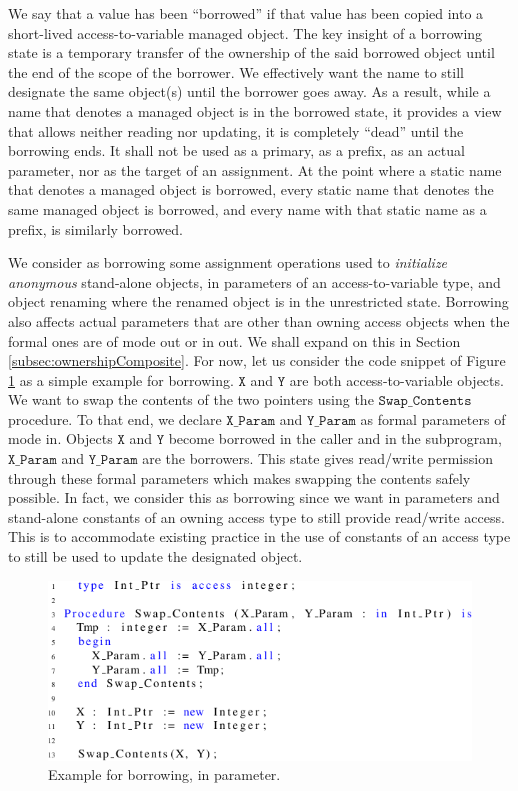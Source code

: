 \documentclass{llncs}
\newcommand\var[1]{\ensuremath{\mathtt{#1}}}
\newcommand{\keyword}[1]{\textsf{#1}}
\begin{document}
We say that a value has been ``borrowed'' if that value has been copied into a short-lived access-to-variable managed object.
The key insight of a borrowing state is a temporary transfer of the ownership of the said borrowed object until the end of the scope of the borrower.
We effectively want the name to still designate the same object(s) until the borrower goes away. As a result, while a name that denotes a managed object
is in the borrowed state, it provides a view that allows neither reading nor updating, it is completely ``dead'' until the borrowing ends. It shall not
be used as a primary, as a prefix, as an actual parameter, nor as the target of an assignment. At the point where a static name that denotes a managed
object is borrowed, every static name that denotes the same managed object is borrowed, and every name with that static name as a prefix, is similarly borrowed.

We consider as borrowing some assignment operations used to \textit{initialize anonymous} stand-alone objects, \keyword{in} parameters of an access-to-variable
type, and object renaming where the renamed object is in the unrestricted state. Borrowing also affects actual parameters that are other than owning access objects
when the formal ones are of mode \keyword{out} or \keyword{in out}. We shall expand on this in Section \ref{subsec:ownershipComposite}. For now, let us consider the
code snippet of Figure \ref{fig:borrow_ex1} as a simple example for borrowing. \var{X} and \var{Y} are both access-to-variable objects. We want to swap the contents of the two
pointers using the \var{Swap\_Contents} procedure. To that end, we declare \var{X\_Param} and \var{Y\_Param} as formal parameters of mode \keyword{in}. Objects \var{X} and \var{Y} become borrowed
in the caller and in the subprogram, \var{X\_Param} and \var{Y\_Param} are the borrowers. This state gives read/write permission through these formal parameters which makes swapping
the contents safely possible. In fact, we consider this as borrowing since we want \keyword{in} parameters and stand-alone constants of an owning access type to still
provide read/write access. This is to accommodate existing practice in the use of constants of an access type to still be used to update the designated object.

\begin{figure}[htb!]
\centering
   \includegraphics[]{borrow_ex1}
   \caption{Example for borrowing, \keyword{in} parameter.}
   \label{fig:borrow_ex1}
\end{figure}
\end{document}
